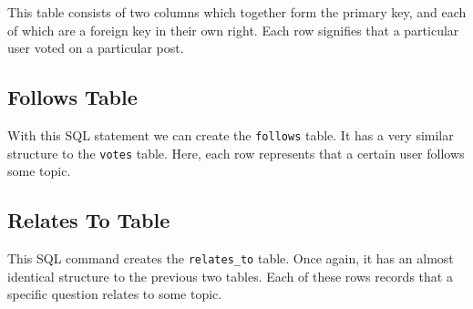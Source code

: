 This table consists of two columns which together form the primary key, and each of which are a foreign key in their own right. Each row signifies that a particular user voted on a particular post.


\subsection{Follows Table}

With this SQL statement we can create the \verb`follows` table. It has a very similar structure to the \verb`votes` table. Here, each row represents that a certain user follows some topic.


\subsection{Relates To Table}

This SQL command creates the \verb`relates_to` table. Once again, it has an almost identical structure to the previous two tables. Each of these rows records that a specific question relates to some topic.

